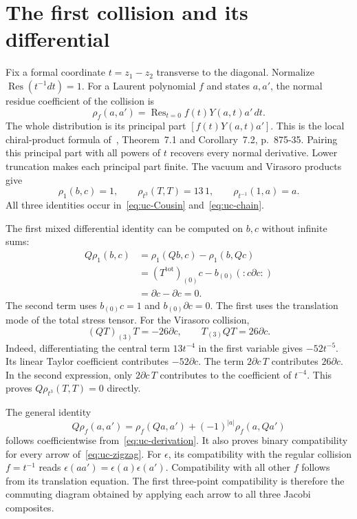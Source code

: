 \section{The first collision and its differential}

Fix a formal coordinate $t=z_1-z_2$ transverse to the diagonal.
Normalize $\operatorname{Res}(t^{-1}dt)=1$.
For a Laurent polynomial $f$ and states $a,a'$, the normal residue coefficient of the collision is
\begin{equation}\label{eq:uc-rho}
 \rho_f(a,a')=\operatorname{Res}_{t=0}f(t)Y(a,t)a'\,dt.
\end{equation}
The whole distribution is its principal part $[f(t)Y(a,t)a']$.
This is the local chiral-product formula of~\cite{Frenkel026}, Theorem~7.1 and Corollary~7.2, p.~875-35.
Pairing this principal part with all powers of $t$ recovers every normal derivative.
Lower truncation makes each principal part finite.
The vacuum and Virasoro products give
\begin{equation}\label{eq:uc-firstcoll}
 \rho_1(b,c)=1,\qquad \rho_{t^3}(T,T)=13\,1,
 \qquad \rho_{t^{-1}}(1,a)=a.
\end{equation}
All three identities occur in~\eqref{eq:uc-Cousin} and~\eqref{eq:uc-chain}.

The first mixed differential identity can be computed on $b,c$ without infinite sums:
\begin{align*}
 Q\rho_1(b,c)
 &=\rho_1(Qb,c)-\rho_1(b,Qc)\\
 &=(T^{\mathrm{tot}})_{(0)}c-b_{(0)}(:c\partial c:)\\
 &=\partial c-\partial c=0.
\end{align*}
The second term uses $b_{(0)}c=1$ and $b_{(0)}\partial c=0$.
The first uses the translation mode of the total stress tensor.
For the Virasoro collision,
\[
 (QT)_{(3)}T=-26\partial c,
 \qquad T_{(3)}QT=26\partial c.
\]
Indeed, differentiating the central term $13t^{-4}$ in the first variable gives $-52t^{-5}$.
Its linear Taylor coefficient contributes $-52\partial c$.
The term $2\partial c\,T$ contributes $26\partial c$.
In the second expression, only $2\partial c\,T$ contributes to the coefficient of $t^{-4}$.
This proves $Q\rho_{t^3}(T,T)=0$ directly.

The general identity
\[
 Q\rho_f(a,a')=\rho_f(Qa,a')+(-1)^{|a|}\rho_f(a,Qa')
\]
follows coefficientwise from~\eqref{eq:uc-derivation}.
It also proves binary compatibility for every arrow of~\eqref{eq:uc-zigzag}.
For $\epsilon$, its compatibility with the regular collision $f=t^{-1}$ reads
$\epsilon(aa')=\epsilon(a)\epsilon(a')$.
Compatibility with all other $f$ follows from its translation equation.
The first three-point compatibility is therefore the commuting diagram obtained by applying each arrow to all three Jacobi composites.


